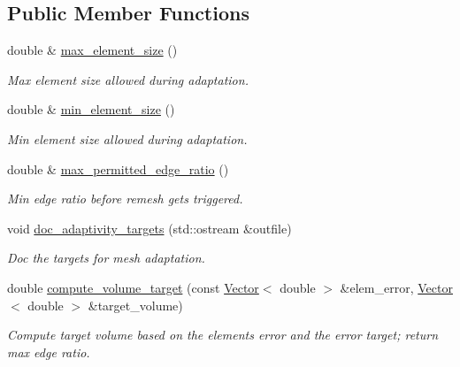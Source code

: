 \subsection*{Public Member Functions}
\begin{DoxyCompactItemize}
\item 
double \& \hyperlink{classoomph_1_1RefineableTetMeshBase_a84198746ef0ce7787a1282d9de223504}{max\+\_\+element\+\_\+size} ()
\begin{DoxyCompactList}\small\item\em Max element size allowed during adaptation. \end{DoxyCompactList}\item 
double \& \hyperlink{classoomph_1_1RefineableTetMeshBase_ab5b73ad7265db80510c5b822516b0575}{min\+\_\+element\+\_\+size} ()
\begin{DoxyCompactList}\small\item\em Min element size allowed during adaptation. \end{DoxyCompactList}\item 
double \& \hyperlink{classoomph_1_1RefineableTetMeshBase_af62f816ad38f1221f24e5637731ed320}{max\+\_\+permitted\+\_\+edge\+\_\+ratio} ()
\begin{DoxyCompactList}\small\item\em Min edge ratio before remesh gets triggered. \end{DoxyCompactList}\item 
void \hyperlink{classoomph_1_1RefineableTetMeshBase_a2e94ec6d2b35b8f84a38a165d9037908}{doc\+\_\+adaptivity\+\_\+targets} (std\+::ostream \&outfile)
\begin{DoxyCompactList}\small\item\em Doc the targets for mesh adaptation. \end{DoxyCompactList}\item 
double \hyperlink{classoomph_1_1RefineableTetMeshBase_a32bd7424c47ada606aa3a5248f19771a}{compute\+\_\+volume\+\_\+target} (const \hyperlink{classoomph_1_1Vector}{Vector}$<$ double $>$ \&elem\+\_\+error, \hyperlink{classoomph_1_1Vector}{Vector}$<$ double $>$ \&target\+\_\+volume)
\begin{DoxyCompactList}\small\item\em Compute target volume based on the elements\textquotesingle{} error and the error target; return max edge ratio. \end{DoxyCompactList}\end{DoxyCompactItemize}
